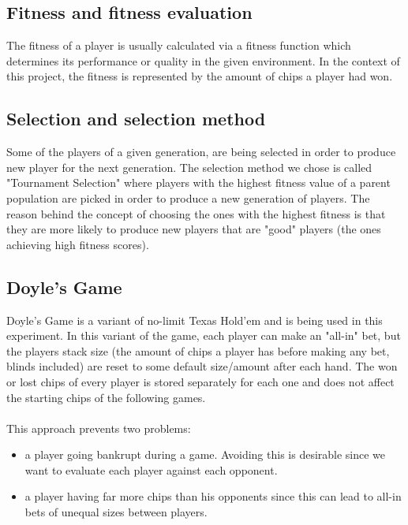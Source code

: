 \documentclass[12pt,fleqn,a4paper]{article}
\begin{document}
\subsection{Fitness and fitness evaluation}
\label{fitness}
The fitness of a player is usually calculated via a fitness function which determines its performance or quality in the given environment. In the context of this project, the fitness is represented by the amount of chips a player had won.

\subsection{Selection and selection method}
\label{selection}
Some of the players of a given generation, are being selected in order to produce new player for the next generation. The selection method we chose is called "Tournament Selection" where players with the highest fitness value of a parent population are picked in order to produce a new generation of players. The reason behind the concept of choosing the ones with the highest fitness is that they are more likely to produce new players that are "good" players (the ones achieving high fitness scores). 

\subsection{Doyle's Game}
\label{doyle}
Doyle's Game is a variant of no-limit Texas Hold'em and is being used in this experiment. In this variant of the game, each player can make an "all-in" bet, but the players stack size (the amount of chips a player has before making any bet, blinds included) are reset to some default size/amount after each hand. The won or lost chips of every player is stored separately for each one and does not affect the starting chips of the following games.\\\\
This approach prevents two problems:
\begin{itemize}
	\item a player going bankrupt during a game. Avoiding this is desirable since we want to evaluate each player against each opponent.
	\item a player having far more chips than his opponents since this can lead to all-in bets of unequal sizes between players.
\end{itemize}
\end{document}
